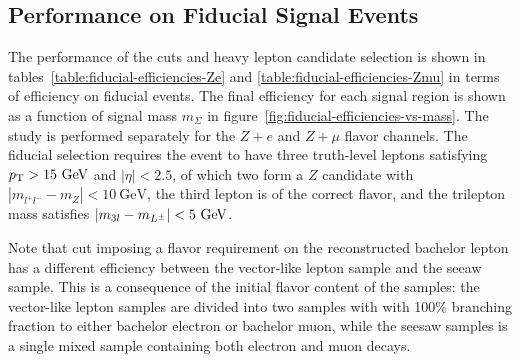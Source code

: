 \subsection{Performance on Fiducial Signal Events}\label{sec:fiducial-cutflow}
The performance of the cuts and heavy lepton candidate selection is shown in tables~\ref{table:fiducial-efficiencies-Ze} and \ref{table:fiducial-efficiencies-Zmu} in terms of efficiency on fiducial events. The final efficiency for each signal region is shown as a function of signal mass $m_{\Sigma}$ in figure~\ref{fig:fiducial-efficiencies-vs-mass}. The study is performed separately for the $Z+e$ and $Z+\mu$ flavor channels. The fiducial selection requires the event to have three truth-level leptons satisfying $p_{\text{T}}>15~\mbox{GeV}$ and $|\eta|<2.5$, of which two form a $Z$ candidate with $|m_{l^+l^-}-m_Z|<10~\mbox{GeV}$, the third lepton is of the correct flavor, and the trilepton mass satisfies $|m_{3l}-m_{L^{\pm}}|<5~\mbox{GeV}$.

Note that cut imposing a flavor requirement on the reconstructed bachelor lepton has a different efficiency between the vector-like lepton sample and the seeaw sample. This is a consequence of the initial flavor content of the samples: the vector-like lepton samples are divided into two samples with with 100\% branching fraction to either bachelor electron or bachelor muon, while the seesaw samples is a single mixed sample containing both electron and muon decays. 


